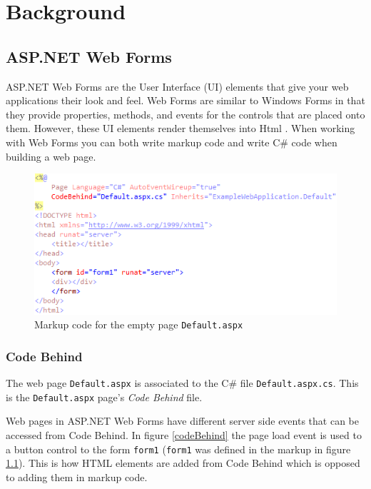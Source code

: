 \chapter{Background}

\section{ASP.NET Web Forms} %
\label{sec:asp_net_web_forms}
	ASP.NET Web Forms are the User Interface (UI) elements that give your web applications their look and feel. Web Forms are similar to Windows Forms \cite{msdn01} in that they provide properties, methods, and events for the controls that are placed onto them. However, these UI elements render themselves into Html \cite{msdn02}. When working with Web Forms you can both write markup code and write C\# code when building a web page.  

	\begin{figure}[H]
					\includegraphics[width=12cm]{resources/images/Markup.png}
				\caption{Markup code for the empty page \texttt{Default.aspx}}
				\label{markup}
			\end{figure}

	\subsection{Code Behind} %
	\label{sub:code_behind}
		The web page \texttt{Default.aspx} is associated to the C\# file \texttt{Default.aspx.cs}. This is the \texttt{Default.aspx} page's \emph{Code Behind} file. 

		Web pages in ASP.NET Web Forms have different server side events that can be accessed from Code Behind. In figure \ref{codeBehind} the page load event is used to a button control to the form \texttt{form1} (\texttt{form1} was defined in the markup in figure \ref{markup}). This is how HTML elements are added from Code Behind which is opposed to adding them in markup code.


